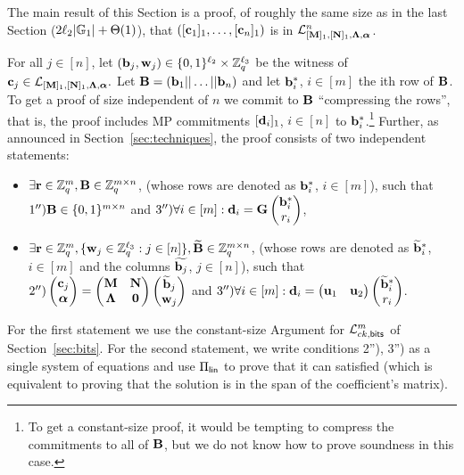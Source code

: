 The main result of this Section is a proof, of roughly the same size as in the last Section ($2{\ell_2}|\mathbb{G}_1|+\Theta(1)$), that  $([\mathbf{c}_1]_1,\ldots,[\mathbf{c}_n]_1)$ is in $\mathcal{L}_{[\mathbf{{M}}]_1,[\mathbf{{N}}]_1,\mathbf{{\Lambda}},{\boldsymbol \alpha}}^n$.

For all $j \in [n]$, let $(\mathbf{b}_j,\mathbf{w}_j) \in \{0,1\}^{{\ell_2}} \times \mathbb{Z}_q^{{\ell_3}}$ be the witness of $\mathbf{c}_j \in \mathcal{L}_{[\mathbf{{M}}]_1,[\mathbf{{N}}]_1,\mathbf{{\Lambda}},{\boldsymbol \alpha}}.$ Let $\mathbf{{B}}=(\mathbf{b}_1|| \ldots ||\mathbf{b}_n)$ and let $\mathbf{b}^*_{i}$, $i \in [m]$ the ith row of $\mathbf{{B}}$. To get a proof of size independent of $n$ we commit to $\mathbf{{B}}$ ``compressing the rows'', that is, the proof includes MP commitments $[\mathbf{d}_i]_1$, $i \in [n]$ to $\mathbf{b}_i^*$.\footnote{To get a constant-size proof, it would be tempting to compress the commitments to all of $\mathbf{{B}}$, but we do not know how to prove soundness in this case.} Further, as announced in Section~\ref{sec:techniques}, the proof consists of two independent statements:
\begin{itemize}
\item $\exists \mathbf{r} \in \mathbb{Z}_q^m, \mathbf{{B}} \in \mathbb{Z}_q^{m \times n}$, (whose rows are denoted as $\mathbf{b}_i^*$, $i \in [m]$), such that  
$1'') \mathbf{{B}} \in \{0,1\}^{m \times n}$ and $3'') \forall i \in [m]: \mathbf{d}_i=\mathbf{{G}}\begin{pmatrix}
\mathbf{b}_i^*  \\ r_i  
\end{pmatrix}$,
\item $\exists \mathbf{r} \in \mathbb{Z}_q^m, \{\mathbf{w}_j \in\mathbb{Z}_q^{\ell_3}: j \in [n]\}, \widetilde{\mathbf{{B}}} \in \mathbb{Z}_q^{m \times n}$, (whose rows are denoted as $\widetilde{\mathbf{b}}_i^*$, $i \in [m]$ and the columns $\widetilde{\mathbf{b}_j}$, $j \in [n]$), such that  
   $2'') \left(\begin{matrix}
    \mathbf{c}_j\\
    {\boldsymbol \alpha}
\end{matrix}\right)
=
\begin{pmatrix}
    \mathbf{{M}}       & \mathbf{{N}}\\
    \mathbf{{\Lambda}} & \mathbf{{0}}
\end{pmatrix}
\left(\begin{matrix}
    \widetilde{\mathbf{b}}_j\\
    \mathbf{w}_j
\end{matrix}\right)$ and $3'') \forall i \in [m]: \mathbf{d}_i=\begin{pmatrix} \mathbf{u}_1 &   \mathbf{u}_2 \end{pmatrix}   \begin{pmatrix}
\widetilde{\mathbf{b}}^*_i  \\ r_i  
\end{pmatrix}$.
\end{itemize} 
For the first statement we use the constant-size Argument for $\mathcal{L}_{ck,\mathsf{bits}}^m$ of Section~\ref{sec:bits}. For the second statement, we write conditions 2''), 3'') as a single system of equations and use $\Pi_{\mathsf{lin}}$ to prove that it can satisfied (which is equivalent to proving that the solution is in the span of the coefficient's matrix).  


